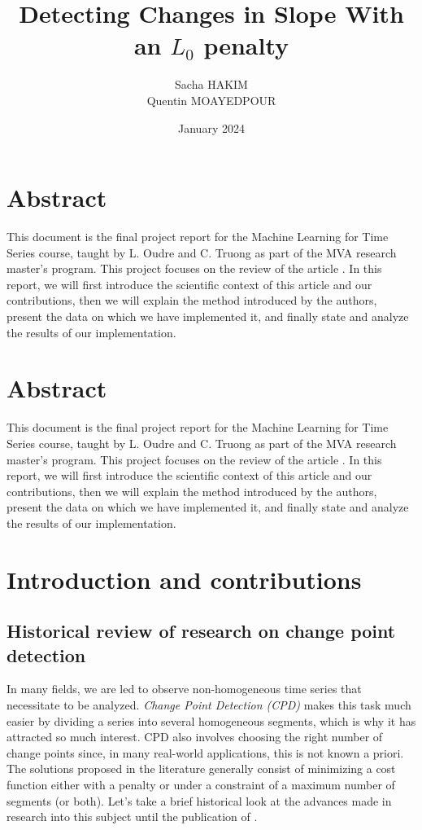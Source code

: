 \documentclass[11pt]{article}
\title{\fontsize{20pt}{10pt} \selectfont  Detecting Changes in Slope With an $L_0$ penalty}
\author{
    \small Sacha HAKIM \email{sacha.hakim@dauphine.eu} \\
    \small Quentin MOAYEDPOUR \email{qmoayedpour@ensae.fr}}
\date{\small January 2024}
\begin{document}
\maketitle

\section*{Abstract}

This document is the final project report for the Machine Learning for Time Series course, taught by L. Oudre and C. Truong as part of the MVA research master's program. This project focuses on the review of the article  \parencite{maidstone2019}. In this report, we will first introduce the scientific context of this article and our contributions, then we will explain the method introduced by the authors, present the data on which we have implemented it, and finally state and analyze the results of our implementation. 


\section*{Abstract}

This document is the final project report for the Machine Learning for Time Series course, taught by L. Oudre and C. Truong as part of the MVA research master's program. This project focuses on the review of the article  \parencite{maidstone2019}. In this report, we will first introduce the scientific context of this article and our contributions, then we will explain the method introduced by the authors, present the data on which we have implemented it, and finally state and analyze the results of our implementation. 

\section{Introduction and contributions}

\subsection{Historical review of research on change point detection }

In many fields, we are led to observe non-homogeneous time series that necessitate to be analyzed. \textit{Change Point Detection (CPD)} makes this task much easier by dividing a series into several homogeneous segments, which is why it has attracted so much interest. CPD also involves choosing the right number of change points since, in many real-world applications, this is not known a priori. The solutions proposed in the literature generally consist of minimizing a cost function either with a penalty or under a constraint of a maximum number of segments (or both). Let's take a brief historical look at the advances made in research into this subject until the publication of \textcite{maidstone2019}.
\end{document}
